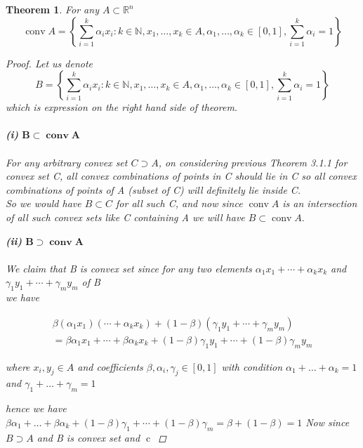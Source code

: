 \documentclass[oneside]{book}
\newtheorem{theorem}{Theorem}[section]
\begin{document}
	\begin{theorem}
		\label{t:5.8}
		For  any $A \subset \mathbb{R}^n$
		$$ \operatorname{conv} A=\left\{\sum_{i=1}^{k} \alpha_{i} x_{i}: k \in \mathbb{N}, x_{1}, \ldots, x_{k} \in A, \alpha_{1}, \ldots, \alpha_{k} \in[0,1], \sum_{i=1}^{k} \alpha_{i}=1\right\} $$
		
		\begin{proof}
			Let us denote $$ B = \left\{\sum_{i=1}^{k} \alpha_{i} x_{i}: k \in \mathbb{N}, x_{1}, \ldots, x_{k} \in A, \alpha_{1}, \ldots, \alpha_{k} \in[0,1], \sum_{i=1}^{k} \alpha_{i}=1\right\} $$  which is expression on the right hand side of theorem.\\\\
			\textbf{(i)}  $ \mathbf{B} \subset \mathbf{\operatorname{conv} A}  $\\\\
			For any arbitrary convex set $C \supset A$, on considering previous Theorem 3.1.1 for convex set C, all convex combinations of points in C should lie in C so all convex combinations of points of A (subset of  C) will definitely lie inside C. \\ 
			So we would have $B\subset C $ for all such C, and now since  $\operatorname{conv} A $ is an intersection of all such convex sets like C containing A we will have  $ B \subset \operatorname{conv} A.  $  
			
			\textbf{(ii)}  $ \mathbf{B} \supset \mathbf{\operatorname{conv} A}  $\\\\
			We claim that B is convex set since for any two elements $\alpha_{1} x_{1}+\cdots+\alpha_{k} x_{k}$ and \\ $\gamma_{1} y_{1}+\cdots+\gamma_{m} y_{m}$  of B \\
			we have 
			
			
			\begin{multline}
			\beta\left(\alpha_{1} x_{1}\right)  \left(\cdots+\alpha_{k} x_{k} \right) +(1-\beta)\left(\gamma_{1} y_{1}+\cdots+\gamma_{m} y_{m}\right) \\ = \beta \alpha_{1} x_{1}+\cdots+\beta \alpha_{k} x_{k}+(1-\beta) \gamma_{1} y_{1}+\cdots+(1-\beta) \gamma_{m} y_{m}  
			\end{multline}
			
			where  $x_{i}, y_{j} \in A$ and coefficients $\beta, \alpha_{i}, \gamma_{j} \in[0,1]$ with  condition $\alpha_{1}+\ldots+\alpha_{k}=1$ and $\gamma_{1}+\ldots+\gamma_{m}=1$ 
			
			hence we have \\
			$
			\beta \alpha_{1}+\ldots+\beta \alpha_{k}+(1-\beta) \gamma_{1}+\cdots+(1-\beta) \gamma_{m}=\beta+(1-\beta)=1
			$
			Now since $ B \supset A $ and B is convex set and $\operatorname{c}$
			

\end{proof}
\end{theorem}
\end{document}
